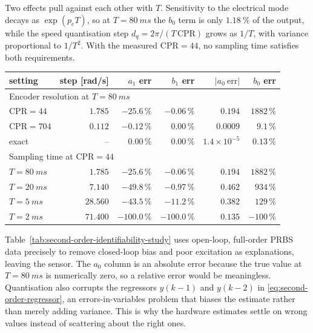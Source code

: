 Two effects pull against each other with \(T\). Sensitivity to the electrical
mode decays as \(\exp(p_eT)\), so at \(T=\SI{80}{ms}\) the \(b_0\) term is only
\(\SI{1.18}{\percent}\) of the output, while the speed quantisation step
\(d_q=2\pi/(T\,\mathrm{CPR})\) grows as \(1/T\), with variance proportional to
\(1/T^2\). With the measured \(\mathrm{CPR}=44\), no sampling time satisfies
both requirements.

\begin{scripttable}
  \centering
  \caption{Open-loop second-order identification under encoder quantisation.}
  \label{tab:second-order-identifiability-study}
  \begin{tabular}{lrrrrr}
    \toprule
    setting & step [\si{rad/s}] & \(a_1\) err & \(b_1\) err &
    \(\lvert a_0\ \mathrm{err}\rvert\) & \(b_0\) err \\
    \midrule
    \multicolumn{6}{l}{Encoder resolution at \(T=\SI{80}{ms}\)} \\
    \(\mathrm{CPR}=44\)  & \(1.785\) & \(-25.6\,\%\) & \(-0.06\,\%\) & \(0.194\) & \(1882\,\%\) \\
    \(\mathrm{CPR}=704\) & \(0.112\) & \(-0.12\,\%\) & \(0.00\,\%\)  & \(0.0009\) & \(9.1\,\%\) \\
    exact                & --        & \(0.00\,\%\)  & \(0.00\,\%\)  & \(1.4\times10^{-5}\) & \(0.13\,\%\) \\
    \midrule
    \multicolumn{6}{l}{Sampling time at \(\mathrm{CPR}=44\)} \\
    \(T=\SI{80}{ms}\) & \(1.785\)  & \(-25.6\,\%\)  & \(-0.06\,\%\)  & \(0.194\) & \(1882\,\%\) \\
    \(T=\SI{20}{ms}\) & \(7.140\)  & \(-49.8\,\%\)  & \(-0.97\,\%\)  & \(0.462\) & \(934\,\%\) \\
    \(T=\SI{5}{ms}\)  & \(28.560\) & \(-43.5\,\%\)  & \(-11.2\,\%\)  & \(0.382\) & \(129\,\%\) \\
    \(T=\SI{2}{ms}\)  & \(71.400\) & \(-100.0\,\%\) & \(-100.0\,\%\) & \(0.135\) & \(-100\,\%\) \\
    \bottomrule
  \end{tabular}
\end{scripttable}

Table~\ref{tab:second-order-identifiability-study} uses open-loop, full-order
PRBS data precisely to remove closed-loop bias and poor excitation as
explanations, leaving the sensor. The \(a_0\) column is an absolute error
because the true value at \(T=\SI{80}{ms}\) is numerically zero, so a relative
error would be meaningless. Quantisation also corrupts the regressors
\(y(k-1)\) and \(y(k-2)\) in \eqref{eq:second-order-regressor}, an
errors-in-variables problem that biases the estimate rather than merely adding
variance. This is why the hardware estimates settle on wrong
values instead of scattering about the right ones.

